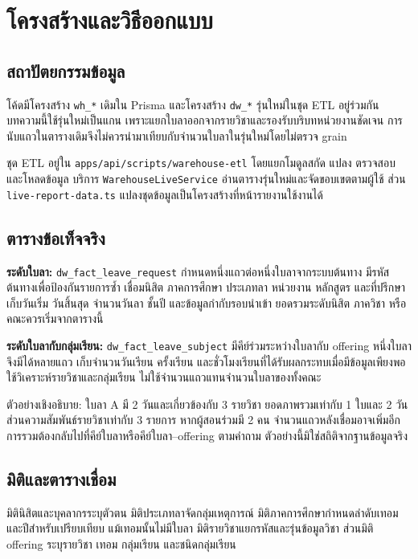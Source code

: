 \section{โครงสร้างและวิธีออกแบบ}
\subsection{สถาปัตยกรรมข้อมูล}
โค้ดมีโครงสร้าง \nolinkurl{wh_*} เดิมใน Prisma และโครงสร้าง \nolinkurl{dw_*} รุ่นใหม่ในชุด ETL อยู่ร่วมกัน บทความนี้ใช้รุ่นใหม่เป็นแกน เพราะแยกใบลาออกจากรายวิชาและรองรับบริบทหน่วยงานชัดเจน การนับแถวในตารางเดิมจึงไม่ควรนำมาเทียบกับจำนวนใบลาในรุ่นใหม่โดยไม่ตรวจ grain\cite{model,etl}

ชุด ETL อยู่ใน \nolinkurl{apps/api/scripts/warehouse-etl} โดยแยกโมดูลสกัด แปลง ตรวจสอบ และโหลดข้อมูล บริการ \nolinkurl{WarehouseLiveService} อ่านตารางรุ่นใหม่และจัดขอบเขตตามผู้ใช้ ส่วน \nolinkurl{live-report-data.ts} แปลงชุดข้อมูลเป็นโครงสร้างที่หน้ารายงานใช้งานได้

\subsection{ตารางข้อเท็จจริง}
\textbf{ระดับใบลา:} \nolinkurl{dw_fact_leave_request} กำหนดหนึ่งแถวต่อหนึ่งใบลาจากระบบต้นทาง มีรหัสต้นทางเพื่อป้องกันรายการซ้ำ เชื่อมนิสิต ภาคการศึกษา ประเภทลา หน่วยงาน หลักสูตร และที่ปรึกษา เก็บวันเริ่ม วันสิ้นสุด จำนวนวันลา ชั้นปี และข้อมูลกำกับรอบนำเข้า ยอดรวมระดับนิสิต ภาควิชา หรือคณะควรเริ่มจากตารางนี้

\textbf{ระดับใบลากับกลุ่มเรียน:} \nolinkurl{dw_fact_leave_subject} มีคีย์ร่วมระหว่างใบลากับ offering หนึ่งใบลาจึงมีได้หลายแถว เก็บจำนวนวันเรียน ครั้งเรียน และชั่วโมงเรียนที่ได้รับผลกระทบเมื่อมีข้อมูลเพียงพอ ใช้วิเคราะห์รายวิชาและกลุ่มเรียน ไม่ใช้จำนวนแถวแทนจำนวนใบลาของทั้งคณะ

ตัวอย่างเชิงอธิบาย: ใบลา A มี 2 วันและเกี่ยวข้องกับ 3 รายวิชา ยอดภาพรวมเท่ากับ 1 ใบและ 2 วัน ส่วนความสัมพันธ์รายวิชาเท่ากับ 3 รายการ หากผู้สอนร่วมมี 2 คน จำนวนแถวหลังเชื่อมอาจเพิ่มอีก การรวมต้องกลับไปที่คีย์ใบลาหรือคีย์ใบลา--offering ตามคำถาม ตัวอย่างนี้มิใช่สถิติจากฐานข้อมูลจริง

\subsection{มิติและตารางเชื่อม}
มิตินิสิตและบุคลากรระบุตัวตน มิติประเภทลาจัดกลุ่มเหตุการณ์ มิติภาคการศึกษากำหนดลำดับเทอมและปีสำหรับเปรียบเทียบ แม้เทอมนั้นไม่มีใบลา มิติรายวิชาแยกรหัสและรุ่นข้อมูลวิชา ส่วนมิติ offering ระบุรายวิชา เทอม กลุ่มเรียน และชนิดกลุ่มเรียน

